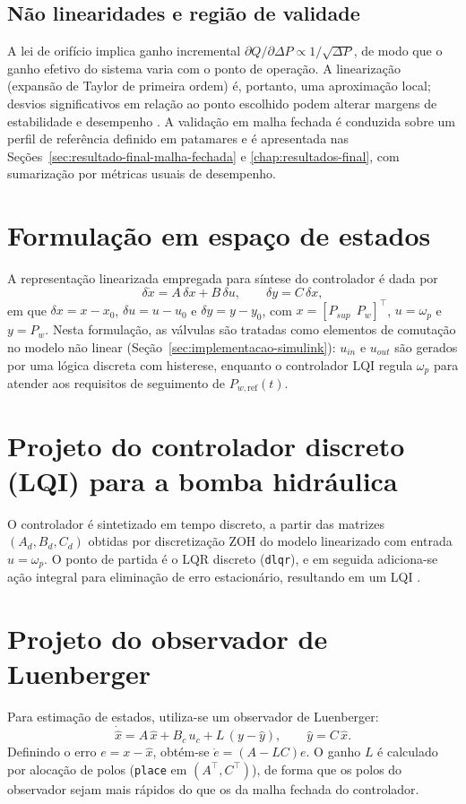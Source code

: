 \subsection{Não linearidades e região de validade}
A lei de orifício implica ganho incremental $\partial Q/\partial \Delta P \propto 1/\sqrt{\Delta P}$, de modo que o ganho efetivo do sistema varia com o ponto de operação. A linearização (expansão de Taylor de primeira ordem) é, portanto, uma aproximação local; desvios significativos em relação ao ponto escolhido podem alterar margens de estabilidade e desempenho \cite{FranklinPowellWorkman1998}. A validação em malha fechada é conduzida sobre um perfil de referência definido em patamares e é apresentada nas Seções~\ref{sec:resultado-final-malha-fechada} e \ref{chap:resultados-final}, com sumarização por métricas usuais de desempenho.
\section{Formulação em espaço de estados}
\label{sec:controle-formulacao-espaço-estados}
A representação linearizada empregada para síntese do controlador é dada por
\[
    \delta\dot{x} = A\,\delta x + B\,\delta u, \qquad \delta y = C\,\delta x,
\]
em que $\delta x = x-x_0$, $\delta u = u-u_0$ e $\delta y = y-y_0$, com $x=[P_{sup}\ \ P_w]^\top$, $u=\omega_p$ e $y=P_w$. Nesta formulação, as válvulas são tratadas como elementos de comutação no modelo não linear (Seção~\ref{sec:implementacao-simulink}): $u_{in}$ e $u_{out}$ são gerados por uma lógica discreta com histerese, enquanto o controlador LQI regula $\omega_p$ para atender aos requisitos de seguimento de $P_{w,\text{ref}}(t)$.
\section{Projeto do controlador discreto (LQI) para a bomba hidráulica}
\label{sec:controle-lqr-luenberger}
O controlador é sintetizado em tempo discreto, a partir das matrizes $(A_d,B_d,C_d)$ obtidas por discretização ZOH do modelo linearizado com entrada $u=\omega_p$. O ponto de partida é o LQR discreto (\texttt{dlqr}), e em seguida adiciona-se ação integral para eliminação de erro estacionário, resultando em um LQI \cite{FranklinPowellWorkman1998,Ogata1997,BrunoAAngelico2018}.
\section{Projeto do observador de Luenberger}
\label{sec:projeto-observador-luenberger}
Para estimação de estados, utiliza-se um observador de Luenberger:
\[
    \dot{\hat{x}} = A\,\hat{x} + B_c\,u_c + L\,(y-\hat{y}),
    \qquad \hat{y}=C\,\hat{x}.
\]
Definindo o erro $e=x-\hat{x}$, obtém-se $\dot{e}=(A-LC)e$. O ganho $L$ é calculado por alocação de polos (\texttt{place} em $(A^\top,C^\top)$), de forma que os polos do observador sejam mais rápidos do que os da malha fechada do controlador.

